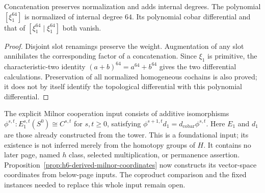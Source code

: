 \begin{proposition}
  \label{prop:h6-polynomial-cocycles}
  \leanok
  Concatenation preserves normalization and adds internal degrees.
  The polynomial $[\xi_1^{64}]$ is normalized of internal degree $64$.
  Its polynomial cobar differential and that of
  $[\xi_1^{64}\mid\xi_1^{64}]$ both vanish.
\end{proposition}
\begin{proof}
  Disjoint slot renamings preserve the weight. Augmentation of any slot
  annihilates the corresponding factor of a concatenation. Since
  $\xi_1$ is primitive, the characteristic-two identity
  $(a+b)^{64}=a^{64}+b^{64}$ gives the two differential calculations.
  Preservation of all normalized homogeneous cochains is also proved;
  it does not by itself identify the topological differential with this
  polynomial differential.
  \leanok
\end{proof}

\begin{definition}
  \label{def:h6-milnor-cooperations}
  \notready
  The explicit Milnor cooperation input consists of additive isomorphisms
  $\phi^{s,t}:E_1^{s,t}(S^0)\cong C^{s,t}$ for $s,t\ge0$, satisfying
  $\phi^{s+1,t}d_1=d_{\mathrm{cobar}}\phi^{s,t}$.
  Here $E_1$ and $d_1$ are those already constructed from the tower.
  This is a foundational input; its existence is not inferred merely from
  the homotopy groups of $H$.  It contains no later page, named $h$ class,
  selected multiplication, or permanence assertion.
  Proposition~\ref{prop:h6-derived-milnor-coordinates} now constructs its
  vector-space coordinates from below-page inputs. The coproduct comparison
  and the fixed instances needed to replace this whole input remain open.
\end{definition}

